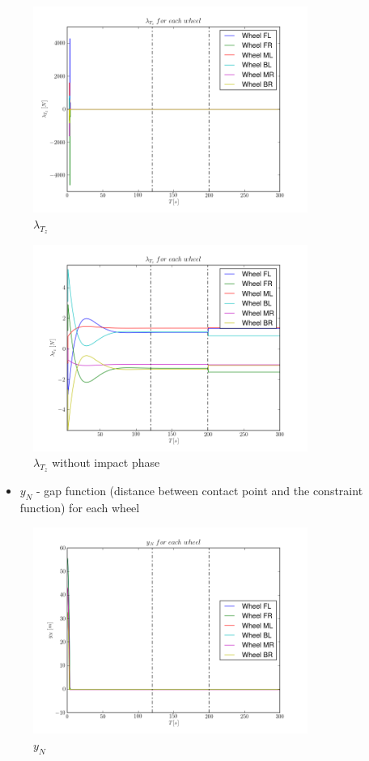\begin{figure}[H]
  \centering
    \includegraphics[width=0.8\textwidth]{lambdaTz5}
  \caption{$\lambda_{T_z}$}
\end{figure}

\begin{figure}[H]
  \centering
    \includegraphics[width=0.8\textwidth]{lambdaTz5zoom}
  \caption{$\lambda_{T_z}$ without impact phase}
\end{figure}

\begin{itemize}
  \item $y_{N}$ - gap function (distance between contact point and the constraint function) for each wheel
\end{itemize}

\begin{figure}[H]
  \centering
    \includegraphics[width=0.8\textwidth]{yN5}
  \caption{$y_N$}
\end{figure}


